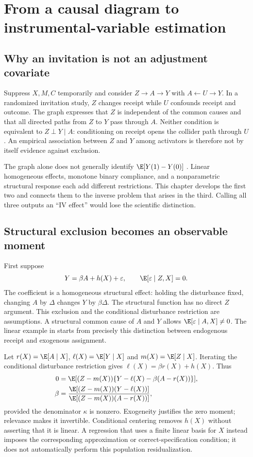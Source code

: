 \chapter{From a causal diagram to instrumental-variable estimation}
\label{r3:instruments}
\section{Why an invitation is not an adjustment covariate}
Suppress $X,M,C$ temporarily and consider
$Z\to A\to Y$ with $A\leftarrow U\to Y$. In a randomized invitation
study, $Z$ changes receipt while $U$ confounds receipt and outcome. The
graph expresses that $Z$ is independent of the common causes and that
all directed paths from $Z$ to $Y$ pass through $A$. Neither condition
is equivalent to $Z\perp Y\mid A$: conditioning on receipt opens the
collider path through $U$. An empirical association between $Z$ and $Y$
among activators is therefore not by itself evidence against exclusion.

The graph alone does not generally identify $\E[Y(1)-Y(0)]$
\citep[Section 3.5]{pearl2009}. Linear homogeneous effects, monotone
binary compliance, and a nonparametric structural response each add
different restrictions. This chapter develops the first two and connects
them to the inverse problem that arises in the third. Calling all three
outputs an ``IV effect'' would lose the scientific distinction.

\section{Structural exclusion becomes an observable moment}
\label{r3:linear-iv}
First suppose
\begin{equation}
 Y=\beta A+h(X)+\varepsilon,
 \qquad \E[\varepsilon\mid Z,X]=0.
 \label{r3:iv-structural}
\end{equation}
The coefficient is a homogeneous structural effect: holding the
disturbance fixed, changing $A$ by $\Delta$ changes $Y$ by $\beta\Delta$.
The structural function has no direct $Z$ argument. This exclusion and
the conditional disturbance restriction are assumptions. A structural
common cause of $A$ and $Y$ allows $\E[\varepsilon\mid A,X]\ne0$.
The linear example in \citet[Section 2]{angrist1996} starts from precisely
this distinction between endogenous receipt and exogenous assignment.

Let $r(X)=\E[A\mid X]$, $\ell(X)=\E[Y\mid X]$ and
$m(X)=\E[Z\mid X]$. Iterating the conditional disturbance restriction
gives $\ell(X)=\beta r(X)+h(X)$. Thus
\begin{align}
 0&=\E[(Z-m(X))\{Y-\ell(X)-\beta(A-r(X))\}],\nonumber\\
 \beta&=\frac{\E[(Z-m(X))(Y-\ell(X))]}
                   {\E[(Z-m(X))(A-r(X))]},
 \label{r3:residual-iv}
\end{align}
provided the denominator $\kappa$ is nonzero. Exogeneity justifies the
zero moment; relevance makes it invertible. Conditional centering removes
$h(X)$ without asserting that it is linear. A regression that uses a
finite linear basis for $X$ instead imposes the corresponding approximation
or correct-specification condition; it does not automatically perform
this population residualization.


